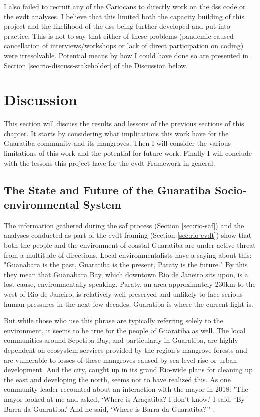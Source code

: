I also failed to recruit any of the Cariocans to directly work on the \ac{dss} code or the \ac{evdt} analyses. I believe that this limited both the capacity building of this project and the likelihood of the \ac{dss} being further developed and put into practice. This is not to say that either of these problems (pandemic-caused cancellation of interviews/workshops or lack of direct participation on coding) were irresolvable. Potential means by how I could have done so are presented in Section \ref{sec:rio-discuss-stakeholder} of the Discussion below.

\section{Discussion} \label{sec:rio-discussion}

This section will discuss the results and lessons of the previous sections of this chapter. It starts by considering what implications this work have for the Guaratiba community and its mangroves. Then I will consider the various limitations of this work and the potential for future work. Finally I will conclude with the lessons this project have for the \ac{evdt} Framework in general.

\subsection{The State and Future of the Guaratiba Socio-environmental System} 

The information gathered during the \ac{saf} process (Section \ref{sec:rio-saf}) and the analyses conducted as part of the \ac{evdt} framing (Section \ref{sec:rio-evdt}) show that both the people and the environment of coastal Guaratiba are under active threat from a multitude of directions. Local environmentalists have a saying about this: "Guanabara is the past, Guaratiba is the present, Paraty is the future." By this they mean that Guanabara Bay, which downtown Rio de Janeiro sits upon, is a lost cause, environmentally speaking. Paraty, an area approximately 230km to the west of Rio de Janeiro, is relatively well preserved and unlikely to face serious human pressures in the next few decades. Guaratiba is where the current fight is. 

But while those who use this phrase are typically referring solely to the environment, it seems to be true for the people of Guaratiba as well. The local communities around Sepetiba Bay, and particularly in Guaratiba, are highly dependent on ecosystem services provided by the region's mangrove forests and are vulnerable to losses of these mangroves caused by sea level rise or urban development.  And the city, caught up in its grand Rio-wide plans for cleaning up the east and developing the north, seems not to have realized this. As one community leader recounted about an interaction with the mayor in 2018: "The mayor looked at me and asked, `Where is Araçatiba? I don’t know.’ I said, `By Barra da Guaratiba.’ And he said, `Where is Barra da Guaratiba?'" \cite{stroblFollowingRecentEviction2018}. 

